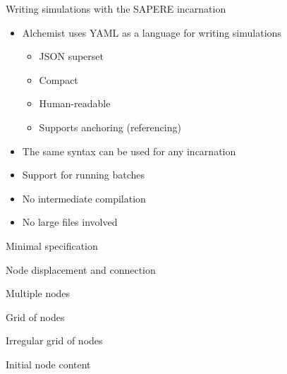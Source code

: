 \documentclass[presentation]{beamer}
\begin{document}
\begin{frame}{Writing simulations with the SAPERE incarnation}
	\begin{itemize}
			\item Alchemist uses YAML as a language for writing simulations
		\begin{itemize}
			\item JSON superset
			\item Compact
			\item Human-readable
			\item Supports anchoring (referencing)
		\end{itemize}
		\item The same syntax can be used for any incarnation
		\item Support for running batches
		\item No intermediate compilation
		\item No large files involved
	\end{itemize}
\end{frame}

\newcommand{\saperesimsize}[2]{%
}
\newcommand{\saperesim}[1]{\saperesimsize{#1}{\tiny}}

\begin{frame}[fragile]{Minimal specification}
	\saperesimsize{00-minimal}{\normalsize}
\end{frame}

\begin{frame}[fragile]{Node displacement and connection}
	\saperesim{01-nodes}
\end{frame}

\begin{frame}[fragile]{Multiple nodes}
	\saperesim{02-manynodes}
\end{frame}

\begin{frame}[fragile]{Grid of nodes}
	\saperesim{03-grid}
\end{frame}

\begin{frame}[fragile]{Irregular grid of nodes}
	\saperesim{04-perturb-grid}
\end{frame}

\begin{frame}[fragile]{Initial node content}
	\saperesim{05-content}
\end{frame}
\end{document}
